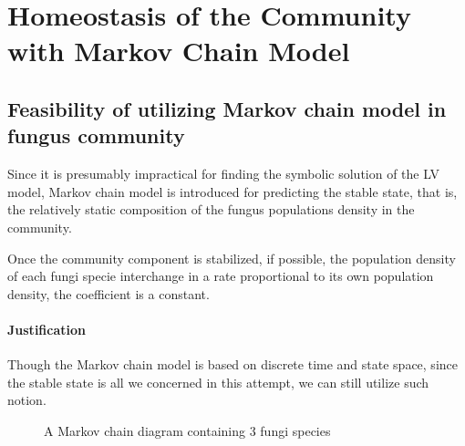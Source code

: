 \section{Homeostasis of the Community with Markov Chain Model}\label{sec:markov}


\subsection{Feasibility of utilizing Markov chain model in fungus community}

Since it is presumably impractical for finding the symbolic solution of the LV model, Markov chain model is introduced for predicting the stable state, that is, the relatively static composition of the fungus populations density in the community.

\begin{definition}
    Once the community component is stabilized, if possible, the population density of each fungi specie interchange in a rate proportional to its own population density, the coefficient is a constant.
\end{definition}

\paragraph{Justification} Though the Markov chain model is based on discrete time and state space, since the stable state is all we concerned in this attempt, we can still utilize such notion.

\begin{figure}\caption{A Markov chain diagram containing 3 fungi species}\label{fig:markov3}
    \begin{center}
    \end{center}
\end{figure}


